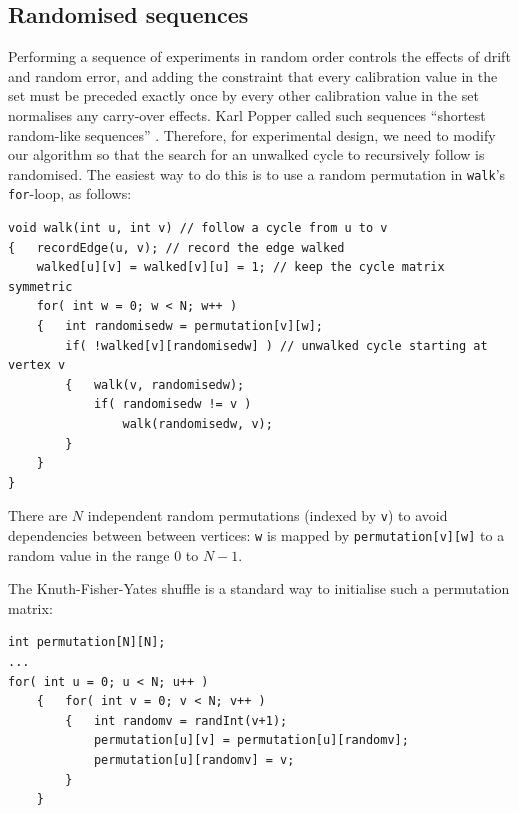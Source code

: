 \documentclass[prodmode,acmtecs]{acmsmall} %
\begin{document}
\subsection{Randomised sequences}\label{randomise}

Performing a sequence of experiments in random order controls the effects of drift and random error, and adding the constraint that every calibration value in the set must be preceded exactly once by every other calibration value in the set normalises any carry-over effects. Karl Popper called such sequences ``shortest random-like sequences'' \cite{popper}. Therefore, for experimental design, we need to modify our algorithm so that the search for an unwalked cycle to recursively follow is randomised. The easiest way to do this is to use a random permutation in \texttt{walk}'s \texttt{for}-loop, as follows:

\begin{verbatim}
void walk(int u, int v) // follow a cycle from u to v
{   recordEdge(u, v); // record the edge walked
    walked[u][v] = walked[v][u] = 1; // keep the cycle matrix symmetric
    for( int w = 0; w < N; w++ ) 
    {   int randomisedw = permutation[v][w];
        if( !walked[v][randomisedw] ) // unwalked cycle starting at vertex v
        {   walk(v, randomisedw);
            if( randomisedw != v )
                walk(randomisedw, v);
        }
    }
}
\end{verbatim}

There are $N$ independent random permutations (indexed by \texttt{v}) to avoid dependencies between between vertices: \texttt{w} is mapped by \texttt{permutation[v][w]} to a random value in the range $0$ to $N-1$.


The Knuth-Fisher-Yates shuffle \cite[p145--146]{knuth2} is a standard way to initialise such a permutation matrix:\label{shuffle}

\begin{verbatim}
int permutation[N][N];
...
for( int u = 0; u < N; u++ )
    {   for( int v = 0; v < N; v++ )
        {   int randomv = randInt(v+1);
            permutation[u][v] = permutation[u][randomv];
            permutation[u][randomv] = v;
        }
    }
\end{verbatim}
\end{document}

